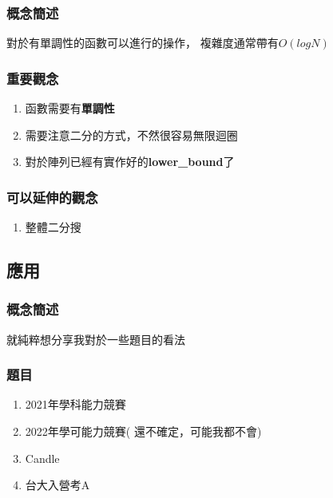 \documentclass[12pt,oneside]{article}
\begin{document}
\subsubsection*{概念簡述}
對於有單調性的函數可以進行的操作，
複雜度通常帶有$O(log N)$

\subsubsection*{重要觀念}
\begin{adjustwidth}{2em}{0em}
\begin{enumerate}
    \item 函數需要有\textbf{單調性}
    \item 需要注意二分的方式，不然很容易無限迴圈
    \item 對於陣列已經有實作好的\textbf{lower\_bound}了
\end{enumerate}
\end{adjustwidth}

\subsubsection*{可以延伸的觀念}
\begin{adjustwidth}{2em}{0em}
\begin{enumerate}
    \item 整體二分搜
\end{enumerate}
\end{adjustwidth}

\clearpage
\subsection{應用}
\subsubsection*{概念簡述}
就純粹想分享我對於一些題目的看法
\subsubsection*{題目}
\begin{adjustwidth}{2em}{0em}
\begin{enumerate}
    \item 2021年學科能力競賽
    \item 2022年學可能力競賽( 還不確定，可能我都不會)
    \item Candle
    \item 台大入營考A
\end{enumerate}
\end{adjustwidth}
\end{document}
